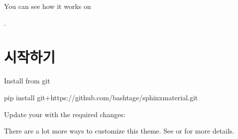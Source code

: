 \documentclass[letterpaper,10pt,english]{sphinxmanual}
\begin{document}
You can see how it works on %
\begin{footnote}[6]\sphinxAtStartFootnote
{}
%
\end{footnote}.


\chapter{시작하기}
\label{\detokenize{index:id2}}
Install from git

\begin{sphinxVerbatim}[commandchars=\\\{\}]
pip install git+https://github.com/bashtage/sphinx\PYGZhy{}material.git
\end{sphinxVerbatim}

Update your  with the required changes:

\begin{sphinxVerbatim}[commandchars=\\\{\}]
  
\end{sphinxVerbatim}

There are a lot more ways to customize this theme. See 
or  for more details.
\end{document}
